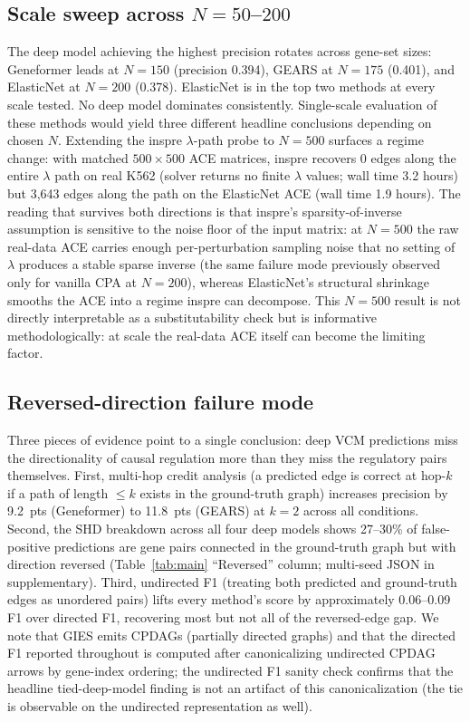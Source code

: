 \documentclass{article}
\theoremstyle{plain}
\theoremstyle{definition}
\theoremstyle{remark}
\begin{document}
\subsection{Scale sweep across $N{=}50$--$200$}
The deep model achieving the highest precision rotates across gene-set sizes: Geneformer leads at $N{=}150$ (precision 0.394), GEARS at $N{=}175$ (0.401), and ElasticNet at $N{=}200$ (0.378). ElasticNet is in the top two methods at every scale tested. No deep model dominates consistently. Single-scale evaluation of these methods would yield three different headline conclusions depending on chosen $N$. Extending the inspre $\lambda$-path probe to $N{=}500$ surfaces a regime change: with matched $500 \times 500$ ACE matrices, inspre recovers 0 edges along the entire $\lambda$ path on real K562 (solver returns no finite $\lambda$ values; wall time 3.2 hours) but 3{,}643 edges along the path on the ElasticNet ACE (wall time 1.9 hours). The reading that survives both directions is that inspre's sparsity-of-inverse assumption is sensitive to the noise floor of the input matrix: at $N{=}500$ the raw real-data ACE carries enough per-perturbation sampling noise that no setting of $\lambda$ produces a stable sparse inverse (the same failure mode previously observed only for vanilla CPA at $N{=}200$), whereas ElasticNet's structural shrinkage smooths the ACE into a regime inspre can decompose. This $N{=}500$ result is not directly interpretable as a substitutability check but is informative methodologically: at scale the real-data ACE itself can become the limiting factor.

\subsection{Reversed-direction failure mode}
\label{sec:reversed-edge}
Three pieces of evidence point to a single conclusion: deep VCM predictions miss the directionality of causal regulation more than they miss the regulatory pairs themselves. First, multi-hop credit analysis (a predicted edge is correct at hop-$k$ if a path of length $\leq k$ exists in the ground-truth graph) increases precision by 9.2~pts (Geneformer) to 11.8~pts (GEARS) at $k{=}2$ across all conditions. Second, the SHD breakdown across all four deep models shows 27--30\% of false-positive predictions are gene pairs connected in the ground-truth graph but with direction reversed (Table~\ref{tab:main} ``Reversed'' column; multi-seed JSON in supplementary). Third, undirected F1 (treating both predicted and ground-truth edges as unordered pairs) lifts every method's score by approximately 0.06--0.09 F1 over directed F1, recovering most but not all of the reversed-edge gap. We note that GIES emits CPDAGs (partially directed graphs) and that the directed F1 reported throughout is computed after canonicalizing undirected CPDAG arrows by gene-index ordering; the undirected F1 sanity check confirms that the headline tied-deep-model finding is not an artifact of this canonicalization (the tie is observable on the undirected representation as well).
\end{document}
